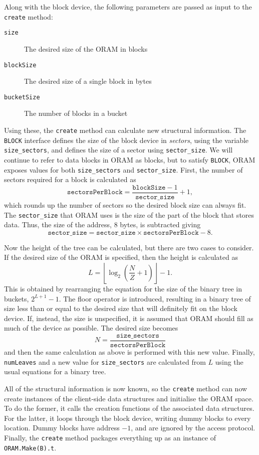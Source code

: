 \documentclass[12pt,a4paper,twoside,openright]{report}
\begin{document}
Along with the block device, the following parameters are passed as input to the \texttt{create} method:

\begin{description}
  \item[\texttt{size}] The desired size of the ORAM in blocks
  \item[\texttt{blockSize}] The desired size of a single block in bytes
  \item[\texttt{bucketSize}] The number of blocks in a bucket
\end{description}

Using these, the \texttt{create} method can calculate new structural information. The \texttt{BLOCK} interface defines the size of the block device in \emph{sectors}, using the variable \texttt{size\_sectors}, and defines the size of a sector using \texttt{sector\_size}. We will continue to refer to data blocks in ORAM as blocks, but to satisfy \texttt{BLOCK}, ORAM exposes values for both \texttt{size\_sectors} and \texttt{sector\_size}. First, the number of sectors required for a block is calculated as $$\mathtt{sectorsPerBlock} = \frac{\mathtt{blockSize} - 1}{\mathtt{sector\_size}} + 1,$$ which rounds up the number of sectors so the desired block size can always fit. The \texttt{sector\_size} that ORAM uses is the size of the part of the block that stores data. Thus, the size of the address, 8 bytes, is subtracted giving $$\mathtt{sector\_size} = \mathtt{sector\_size} \times \mathtt{sectorsPerBlock} - 8.$$

Now the height of the tree can be calculated, but there are two cases to consider. If the desired size of the ORAM is specified, then the height is calculated as $$L = \left\lfloor \log_2\left(\frac{N}{Z} + 1\right)\right\rfloor - 1.$$ This is obtained by rearranging the equation for the size of the binary tree in buckets, $2^{L + 1} - 1$. The floor operator is introduced, resulting in a binary tree of size less than or equal to the desired size that will definitely fit on the block device. If, instead, the size is unspecified, it is assumed that ORAM should fill as much of the device as possible. The desired size becomes $$N = \frac{\mathtt{size\_sectors}}{\mathtt{sectorsPerBlock}}$$ and then the same calculation as above is performed with this new value. Finally, \texttt{numLeaves} and a new value for \texttt{size\_sectors} are calculated from $L$ using the usual equations for a binary tree.

All of the structural information is now known, so the \texttt{create} method can now create instances of the client-side data structures and initialise the ORAM space. To do the former, it calls the creation functions of the associated data structures. For the latter, it loops through the block device, writing dummy blocks to every location. Dummy blocks have address $-1$, and are ignored by the access protocol. Finally, the \texttt{create} method packages everything up as an instance of \texttt{ORAM.Make(B).t}.
\end{document}
